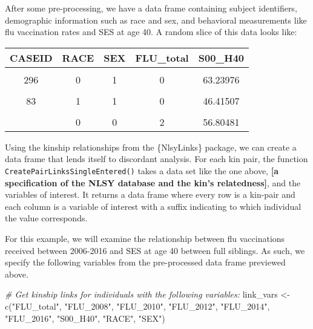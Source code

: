 \documentclass[10pt,a4paper,onecolumn]{article}
\newenvironment{Shaded}{\begin{snugshade}}{\end{snugshade}}
\newcommand{\CommentTok}[1]{\textcolor[rgb]{0.56,0.35,0.01}{\textit{#1}}}
\newcommand{\FunctionTok}[1]{\textcolor[rgb]{0.00,0.00,0.00}{#1}}
\newcommand{\NormalTok}[1]{#1}
\newcommand{\OtherTok}[1]{\textcolor[rgb]{0.56,0.35,0.01}{#1}}
\newcommand{\StringTok}[1]{\textcolor[rgb]{0.31,0.60,0.02}{#1}}
\begin{document}
After some pre-processing, we have a data frame containing subject
identifiers, demographic information such as race and sex, and
behavioral measurements like flu vaccination rates and SES at age 40. A
random slice of this data looks like:

\begin{table}[!h]
\centering
\begin{tabular}[t]{ccccc}
\toprule
CASEID & RACE & SEX & FLU\_total & S00\_H40\\
\midrule
\cellcolor{gray!6}{473} & \cellcolor{gray!6}{0} & \cellcolor{gray!6}{1} & \cellcolor{gray!6}{0} & \cellcolor{gray!6}{23.38833}\\
296 & 0 & 1 & 0 & 63.23976\\
\cellcolor{gray!6}{387} & \cellcolor{gray!6}{1} & \cellcolor{gray!6}{1} & \cellcolor{gray!6}{3} & \cellcolor{gray!6}{64.19161}\\
83 & 1 & 1 & 0 & 46.41507\\
\cellcolor{gray!6}{529} & \cellcolor{gray!6}{0} & \cellcolor{gray!6}{0} & \cellcolor{gray!6}{0} & \cellcolor{gray!6}{33.99638}\\
\addlinespace
29 & 0 & 0 & 2 & 56.80481\\
\bottomrule
\end{tabular}
\end{table}

Using the kinship relationships from the \{NlsyLinks\} package, we can
create a data frame that lends itself to discordant analysis. For each
kin pair, the function \texttt{CreatePairLinksSingleEntered()} takes a
data set like the one above, \textbf{{[}a specification of the NLSY
database and the kin's relatedness{]}}, and the variables of interest.
It returns a data frame where every row is a kin-pair and each column is
a variable of interest with a suffix indicating to which individual the
value corresponds.

For this example, we will examine the relationship between flu
vaccinations received between 2006-2016 and SES at age 40 between full
siblings. As such, we specify the following variables from the
pre-processed data frame previewed above.

\begin{Shaded}
\begin{Highlighting}[]
\CommentTok{\# Get kinship links for individuals with the following variables:}
\NormalTok{link\_vars }\OtherTok{\textless{}{-}} \FunctionTok{c}\NormalTok{(}\StringTok{"FLU\_total"}\NormalTok{, }\StringTok{"FLU\_2008"}\NormalTok{, }\StringTok{"FLU\_2010"}\NormalTok{, }
               \StringTok{"FLU\_2012"}\NormalTok{, }\StringTok{"FLU\_2014"}\NormalTok{, }\StringTok{"FLU\_2016"}\NormalTok{, }
               \StringTok{"S00\_H40"}\NormalTok{, }\StringTok{"RACE"}\NormalTok{, }\StringTok{"SEX"}\NormalTok{)}
\end{Highlighting}
\end{Shaded}
\end{document}
